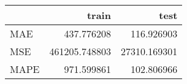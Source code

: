 \begin{tabular}{lrr}
\toprule
{} &          train &          test \\
\midrule
MAE  &     437.776208 &    116.926903 \\
MSE  &  461205.748803 &  27310.169301 \\
MAPE &     971.599861 &    102.806966 \\
\bottomrule
\end{tabular}
